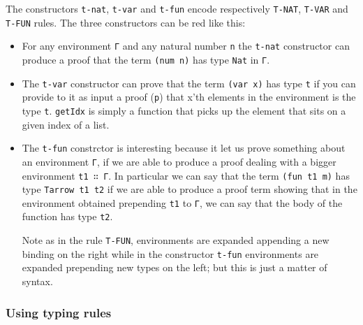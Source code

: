 \documentclass{article}
\begin{document}
The constructors \texttt{t-nat}, \texttt{t-var} and \texttt{t-fun} encode respectively \texttt{T-NAT}, \texttt{T-VAR} and \texttt{T-FUN} rules.
The three constructors can be red like this:
\begin{itemize}

\item For any environment \texttt{Γ} and any natural number \texttt{n} the \texttt{t-nat} constructor can produce a proof that the term \texttt{(num n)} has type \texttt{Nat} in \texttt{Γ}.

\item The \texttt{t-var} constructor can prove that the term \texttt{(var x)} has type \texttt{t} if you can provide to it as input a proof (\texttt{p}) that x'th elements in the environment is the type \texttt{t}.
\texttt{getIdx} is simply a function that picks up the element that sits on a given index of a list.

\item The \texttt{t-fun} constrctor is interesting because it let us prove something about an environment \texttt{Γ}, if we are able to produce a proof dealing with a bigger environment \texttt{t1 ∷ Γ}.
In particular we can say that the term \texttt{(fun t1 m)} has type \texttt{Tarrow t1 t2} if we are able to produce a proof term showing that in the environment obtained prepending \texttt{t1} to \texttt{Γ}, we can say that the body of the function has type \texttt{t2}.

Note as in the rule \texttt{T-FUN}, environments are expanded appending a new binding on the right while in the constructor \texttt{t-fun} environments are expanded prepending new types on the left; but this is just a matter of syntax.

\end{itemize}


\subsubsection{Using typing rules}
\end{document}
